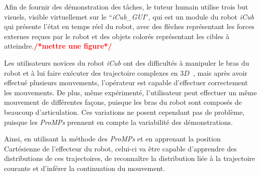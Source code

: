 \documentclass[utf8]{frontiersSCNS} %
\newcommand{\todo}[1]{\textcolor{red}{\textbf{/*#1*/}}}
\begin{document}
Afin de fournir des démonstration des tâches, le tuteur humain utilise trois but visuels, visible virtuellemet sur le
``\textit{iCub\_GUI}'', qui est un module du robot \textit{iCub} qui présente l'état en temps réel du robot, avec des flèches représentant les forces externes reçues par le robot et des objets colorés représentant les cibles à atteindre.\todo{mettre une figure}

Les utilisateurs novices du robot \textit{iCub} ont des difficultés à manipuler le bras du robot et à lui faire exécuter des trajectoire complexes en $3D$~\cite{ivaldi2017towards}, mais après avoir effectué plusieurs mouvements, l'opérateur est capable d'effectuer correctement les mouvements.
De plus, même expérimenté, l'utilisateur peut effectuer un même mouvement de différentes façons, puisque les bras du robot sont composés de beaucoup d'articulation. Ces variations ne posent cependant pas de problème, puisque les \textit{ProMPs} prennent en compte la variabilité des démonstrations.




Ainsi, en utilisant la méthode des \textit{ProMPs} et en apprenant la position Cartésienne de l'effecteur du robot, celui-ci va être capable d'apprendre des distributions de ces trajectoires, de reconnaître la distribution liée à la trajectoire courante et d'inférer la continuation du mouvement.
\end{document}

